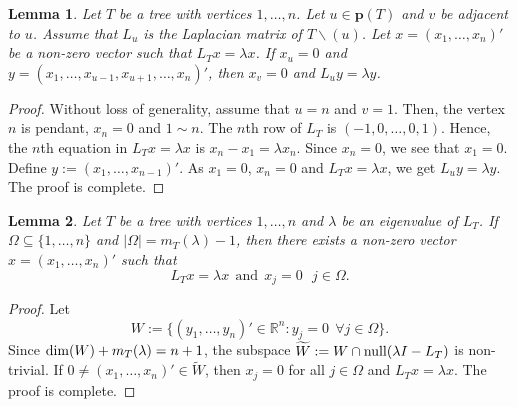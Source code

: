 \documentclass[preprint,12pt]{elsarticle}
\newcommand{\rr}{\mathbb{R}}
\newcommand{\1}{\mathbf{1}}
\newcommand{\0}{\mathbf{0}}
\def\null{{\rm null}}
\def\dim{{\rm dim}}
\def\pt{\mathbf{p}}
\newtheorem{lemma}{Lemma}
\begin{document}
\begin{lemma} \label{b1}
Let $T$ be a tree with vertices $1,\dotsc,n$.
Let $u \in \pt(T)$ and $v$ be adjacent to $u$.
Assume that $L_u$ is the Laplacian matrix of $T \smallsetminus (u)$. 
Let $x=(x_1,\dotsc,x_n)'$ be a non-zero vector such that $L_Tx=\lambda x$. If $x_u=0$ and
$y=(x_1,\dotsc,x_{u-1},x_{u+1},\dotsc,x_n)'$,
then $x_v=0$ and $L_uy=\lambda y$.
    \end{lemma}
\begin{proof}
Without loss of generality, assume that $u=n$ and $v=1$.
Then, the vertex $n$ is pendant, $x_n=0$ and $1 \sim n$.
The $n$th row of $L_T$ is $(-1,0,\dotsc,0,1)$.
Hence, the $n$th equation in $L_{T}x=\lambda x$ is 
$x_n-x_1=\lambda x_n$.
Since $x_n=0$, we see that $x_1=0$. 
Define $y:=(x_1,\dotsc,x_{n-1})'$. As
$x_1=0$, $x_n=0$ and $L_Tx=\lambda x$, we get
$L_u y=\lambda y$. 
The proof is complete.
\end{proof}



\begin{lemma}\label{b2}
Let $T$ be a tree with vertices $1,\dotsc,n$ and
$\lambda$ be an eigenvalue of $L_T$.
If $\Omega \subseteq \{1,\dotsc,n\}$ and $|\Omega|=m_T(\lambda)-1$, then there exists a non-zero vector $x=(x_1,\dotsc,x_n)'$ such that 
    \[L_Tx=\lambda x ~~\mbox{and}~~
x_j=0 ~~~ j \in \Omega.\]
\end{lemma}

\begin{proof}
Let \[W:=\{(y_1,\dotsc,y_n)' \in \rr^n: y_j=0~~\forall j \in \Omega \}.\]
Since ${\dim}(W)+m_T(\lambda)=n+1$, the subspace
$\widetilde{W}:=W \cap \null(\lambda I -L_T)$ is non-trivial.
If $0 \neq (x_1,\dotsc,x_n)' \in \widetilde{W}$, then
$x_j=0$ for all $j \in \Omega$ and $L_Tx=\lambda x$. The proof is complete. 
\end{proof}
\end{document}
